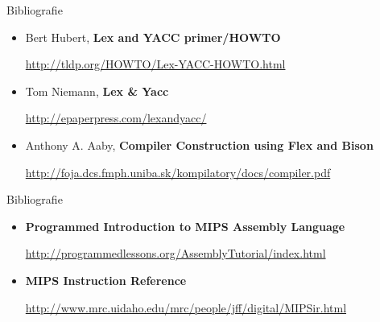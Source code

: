\documentclass[pdf]{beamer}
\begin{document}
\begin{frame}{Bibliografie}
\begin{itemize}
\item
Bert Hubert, \textbf{Lex and YACC primer/HOWTO}

\url{http://tldp.org/HOWTO/Lex-YACC-HOWTO.html}
\newline

\item
Tom Niemann, \textbf{Lex \& Yacc}

\url{http://epaperpress.com/lexandyacc/}
\newline

\item
Anthony A. Aaby, \textbf{Compiler Construction using Flex and Bison}

\url{http://foja.dcs.fmph.uniba.sk/kompilatory/docs/compiler.pdf}
\newline

\end{itemize}
\end{frame}



\begin{frame}[shrink=-10]{Bibliografie}
\begin{itemize}
\item
\textbf{Programmed Introduction to MIPS Assembly Language}

\url{http://programmedlessons.org/AssemblyTutorial/index.html}
\newline

\item
\textbf{MIPS Instruction Reference}

\url{http://www.mrc.uidaho.edu/mrc/people/jff/digital/MIPSir.html}
\newline

\end{itemize}
\end{frame}
\end{document}
